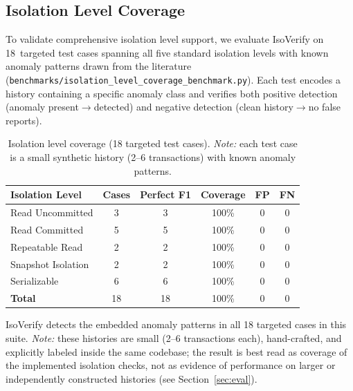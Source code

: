 \documentclass[11pt]{article}
\begin{document}
\subsection{Isolation Level Coverage}
\label{sec:isolcov}

To validate comprehensive isolation level support, we evaluate IsoVerify on
18~targeted test cases spanning all five standard isolation levels with known
anomaly patterns drawn from the literature
(\texttt{benchmarks/isolation\_level\_coverage\_benchmark.py}).  Each test
encodes a history containing a specific anomaly class and verifies both
positive detection (anomaly present$\to$detected) and negative detection
(clean history$\to$no false reports).

\begin{table}[t]
\centering
\caption{Isolation level coverage (18 targeted test cases).
  \emph{Note:} each test case is a small synthetic history (2--6
  transactions) with known anomaly patterns.}
\label{tab:isolcov}
\begin{tabular}{lccccc}
\toprule
\textbf{Isolation Level} & \textbf{Cases} & \textbf{Perfect F1} & \textbf{Coverage} & \textbf{FP} & \textbf{FN} \\
\midrule
Read Uncommitted    & 3 & 3 & 100\% & 0 & 0 \\
Read Committed      & 5 & 5 & 100\% & 0 & 0 \\
Repeatable Read     & 2 & 2 & 100\% & 0 & 0 \\
Snapshot Isolation  & 2 & 2 & 100\% & 0 & 0 \\
Serializable        & 6 & 6 & 100\% & 0 & 0 \\
\midrule
\textbf{Total}      & 18 & 18 & 100\% & 0 & 0 \\
\bottomrule
\end{tabular}
\end{table}

IsoVerify detects the embedded anomaly patterns in all 18 targeted cases in
this suite.  \emph{Note:} these histories are small (2--6 transactions each),
hand-crafted, and explicitly labeled inside the same codebase; the result is
best read as coverage of the implemented isolation checks, not as evidence of
performance on larger or independently constructed histories (see
Section~\ref{sec:eval}).
\end{document}
